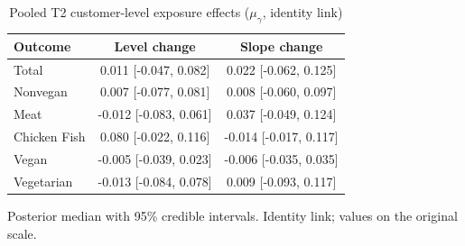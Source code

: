 \begin{table}[H]
\centering
\caption{Pooled T2 customer-level exposure effects ($\mu_\gamma$, identity link)}
\label{tab:a5_t2_mu_gamma}
\begin{tabular}{lcc}
\toprule
Outcome & Level change & Slope change \\
\midrule
Total & 0.011 [-0.047, 0.082] & 0.022 [-0.062, 0.125] \\
Nonvegan & 0.007 [-0.077, 0.081] & 0.008 [-0.060, 0.097] \\
Meat & -0.012 [-0.083, 0.061] & 0.037 [-0.049, 0.124] \\
Chicken Fish & 0.080 [-0.022, 0.116] & -0.014 [-0.017, 0.117] \\
Vegan & -0.005 [-0.039, 0.023] & -0.006 [-0.035, 0.035] \\
Vegetarian & -0.013 [-0.084, 0.078] & 0.009 [-0.093, 0.117] \\
\bottomrule
\end{tabular}
\par\smallskip\footnotesize Posterior median with 95\% credible intervals. Identity link; values on the original scale.
\end{table}
